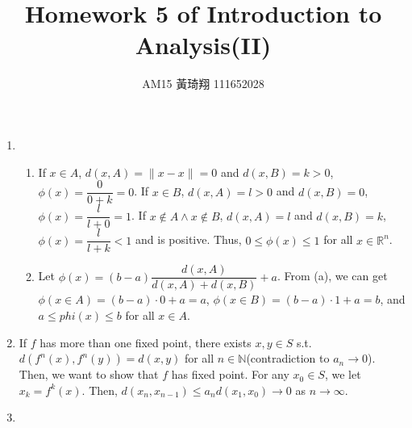 \documentclass[12pt]{article}
\title{Homework 5 of Introduction to Analysis(II)}
\author{AM15 黃琦翔 111652028}
\begin{document}
\maketitle
\begin{enumerate}
    \item \begin{enumerate}
        \item If $x\in A$, $d(x, A) = \| x-x \| = 0$ and $d(x, B) = k > 0$, $\phi(x) = \dfrac{0}{0 + k} = 0$.
        If $x\in B$, $d(x, A) = l > 0$ and $d(x, B) = 0$, $\phi(x) = \dfrac{l}{l + 0} = 1$.
        If $x \notin A \wedge x \notin B$, $d(x, A) = l$ and $d(x, B) = k$, $\phi(x) = \dfrac{l}{l+k} < 1$ and is positive.
        Thus, $0 \leq \phi(x) \leq 1$ for all $x \in \mathbb{R}^n$.

        \item Let $\phi(x) = (b-a)\dfrac{d(x, A)}{d(x, A) + d(x, B)} + a$.
        From (a), we can get $\phi(x\in A) = (b-a)\cdot 0 + a = a$, $\phi(x\in B) = (b-a)\cdot 1 + a = b$,
        and $a \leq phi(x)\leq b$ for all $x\in A$.
    \end{enumerate}

    \item If $f$ has more than one fixed point, there exists $x, y\in S$ s.t. $d(f^n(x), f^n(y)) = d(x, y)$ for all $n\in\mathbb{N}$(contradiction to $a_n \to 0$).
    Then, we want to show that $f$ has fixed point.
    For any $x_0\in S$, we let $x_k = f^k(x)$.
    Then, $d(x_n, x_{n-1}) \leq a_n d(x_1, x_0) \to 0$ as $n\to\infty$.


    \item 
\end{enumerate}
\end{document}
